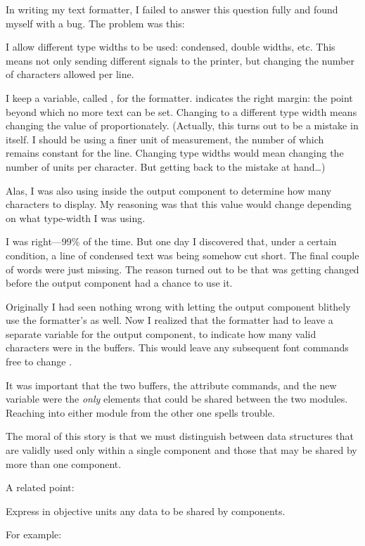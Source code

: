In writing my text formatter, I failed to answer this question fully
and found myself with a bug. The problem was this:

I allow different type widths to be used: condensed, double widths,
etc. This means not only sending different signals to the printer, but
changing the number of characters allowed per line.

I keep a variable, called , for the formatter.
 indicates the right margin: the point beyond which no
more text can be set. Changing to a different type width means
changing the value of  proportionately.  (Actually, this
turns out to be a mistake in itself. I should be using a finer unit of
measurement, the number of which remains constant for the line.
Changing type widths would mean changing the number of units per
character. But getting back to the mistake at hand\dots)

Alas, I was also using  inside the output component to
determine how many characters to display. My reasoning was that this value
would change depending on what type-width I was using.

I was right---99\% of the time. But one day I discovered that, under
a certain condition, a line of condensed text was being somehow cut
short. The final couple of words were just missing. The reason turned out
to be that  was getting changed before the output component had
a chance to use it.

Originally I had seen nothing wrong with letting the output component
blithely use the formatter's  as well. Now I realized that the
formatter had to leave a separate variable for the output component,
to indicate how many valid characters were in the buffers. This would
leave any subsequent font commands free to change .

It was important that the two buffers, the attribute commands, and the
new variable were the \emph{only} elements that could be shared
between the two modules. Reaching into either module from the other
one spells trouble.

The moral of this story is that we must distinguish between data
structures that are validly used only within a single component and those
that may be shared by more than one component.

A related point:

\begin{tip}
Express in objective units any data to be shared by components.
\end{tip}
For example:

